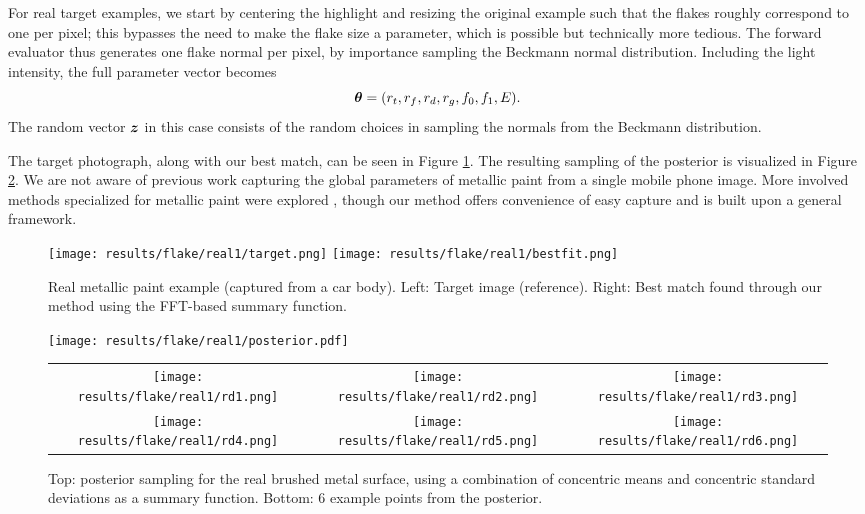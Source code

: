 For real target examples, we start by centering the highlight and resizing the original example such that the flakes roughly correspond to one per pixel; this bypasses the need to make the flake size a parameter, which is possible but technically more tedious. The forward evaluator thus generates one flake normal per pixel, by importance sampling the Beckmann normal distribution. Including the light intensity, the full parameter vector becomes
\[
\bm{\theta} = (r_t, r_f, r_d, r_g, f_0, f_1, E).
\]
The random vector $\bm{z}$ in this case consists of the random choices in sampling the normals from the Beckmann distribution.

The target photograph, along with our best match, can be seen in Figure \ref{fig:flake-gt}. The resulting sampling of the posterior is visualized in Figure \ref{fig:flake}. We are not aware of previous work capturing the global parameters of metallic paint from a single mobile phone image. More involved methods specialized for metallic paint were explored \cite{Rump08}, though our method offers convenience of easy capture and is built upon a general framework.


\begin{figure}[t]
	\texttt{[image: results/flake/real1/target.png]}
	\texttt{[image: results/flake/real1/bestfit.png]}
	\caption{Real metallic paint example (captured from a car body). Left: Target image (reference). Right: Best match found through our method using the FFT-based summary function.}
	\label{fig:flake-gt}
\end{figure}

\begin{figure}[t]
	\texttt{[image: results/flake/real1/posterior.pdf]}
	\addtolength{\tabcolsep}{-3.5pt}
	\begin{tabular}{ccc}
		\texttt{[image: results/flake/real1/rd1.png]} &
		\texttt{[image: results/flake/real1/rd2.png]} &
		\texttt{[image: results/flake/real1/rd3.png]} \\
		\texttt{[image: results/flake/real1/rd4.png]} &
		\texttt{[image: results/flake/real1/rd5.png]} &
		\texttt{[image: results/flake/real1/rd6.png]} \\
	\end{tabular}
	\caption{Top: posterior sampling for the real brushed metal surface, using a combination of concentric means and concentric standard deviations as a summary function. Bottom: 6 example points from the posterior.}
	\label{fig:flake}
\end{figure}


